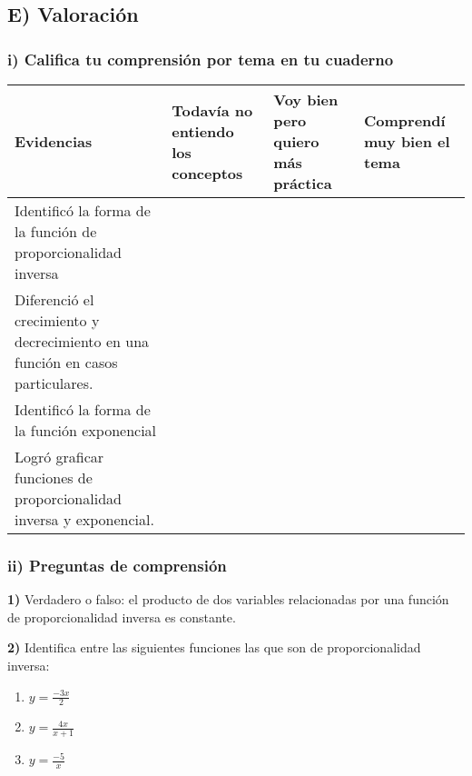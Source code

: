 \documentclass[12pt,a4paper]{article}
\begin{document}
\vspace{5mm}


\subsection*{E) Valoración}

\subsubsection*{i) Califica tu comprensión por tema en tu cuaderno}

\begin{center}
\small
\begin{tabular}{|p{3.5cm}|p{3cm}|p{3cm}|p{3cm}|}
\hline
\textbf{Evidencias} & \textbf{Todavía no entiendo los conceptos} & \textbf{Voy bien pero quiero más práctica} & \textbf{Comprendí muy bien el tema} \\
\hline
Identificó la forma de la función de proporcionalidad inversa & & & \\
\hline
Diferenció el crecimiento y decrecimiento en una función en casos particulares. & & & \\
\hline
Identificó la forma de la función exponencial & & & \\
\hline
Logró graficar funciones de proporcionalidad inversa y exponencial. & & & \\
\hline
\end{tabular}
\end{center}

\subsubsection*{ii) Preguntas de comprensión}

\textbf{1)} Verdadero o falso: el producto de dos variables relacionadas por una función de proporcionalidad inversa es constante.

\textbf{2)} Identifica entre las siguientes funciones las que son de proporcionalidad inversa:

\begin{enumerate}[label=\alph*)]
	
	\vspace{5mm}
	
\item $y = \frac{-3x}{2}$

\vspace{5mm}

\item $y = \frac{4x}{x + 1}$

\vspace{5mm}

\item $y = \frac{-5}{x}$

\vspace{5mm}

\end{enumerate}
\end{document}
